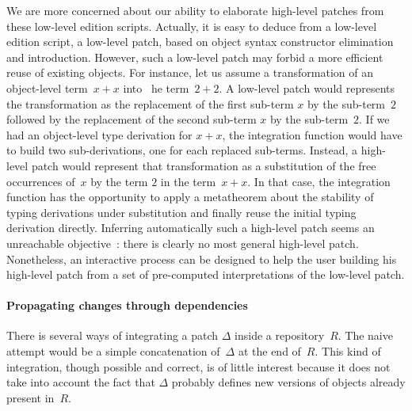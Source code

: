 \documentclass{article}
\newcommand{\remtext}[1]{}
\begin{document}
We are more concerned about our ability to elaborate high-level patches
from these low-level edition scripts. Actually, it is easy to deduce
from a low-level edition script, a low-level patch, based on object
syntax constructor elimination and introduction. However, such a
low-level patch may forbid a more efficient reuse of existing
objects. For instance, let us assume a transformation of an
object-level term~$x + x$ into~ he term~$2 + 2$. A low-level patch
would represents the transformation as the replacement of the first
sub-term $x$ by the sub-term~$2$ followed by the replacement of the
second sub-term $x$ by the sub-term~$2$. If we had an object-level type
derivation for $x + x$, the integration function would have to build
two sub-derivations, one for each replaced sub-terms.  Instead, a
high-level patch would represent that transformation as a substitution
of the free occurrences of~$x$ by the term $2$ in the term~$x + x$. In
that case, the integration function has the opportunity to apply a
metatheorem about the stability of typing derivations under
substitution and finally reuse the initial typing derivation
directly. Inferring automatically such a high-level patch seems an
unreachable objective~: there is clearly no most general high-level
patch. Nonetheless, an interactive process can be designed to help the
user building his high-level patch from a set of pre-computed
interpretations of the low-level patch.

\remtext{Fri Jun 18, 2010 1:38 PM. Il faut différencier deux arbres de
  syntaxe. Une méthode : la distance d'édition syntaxique permet de
  déduire des applications des règles d'élimination et d'introduction
  que l'on peut utiliser pour construire $\Delta$. Référence sur la
  littérature sur les distances d'édition entre arbres. Discussion sur
  l'élaboration de patchs de haut niveau (comme le renommage etc). }

\paragraph{Propagating changes through dependencies}
\-

There is several ways of integrating a patch $\Delta$ inside a
repository~$R$.  The naive attempt would be a simple concatenation
of~$\Delta$ at the end of~$R$.  This kind of integration, though
possible and correct, is of little interest because it does not take
into account the fact that $\Delta$ probably defines new versions of
objects already present in~$R$.
\end{document}
